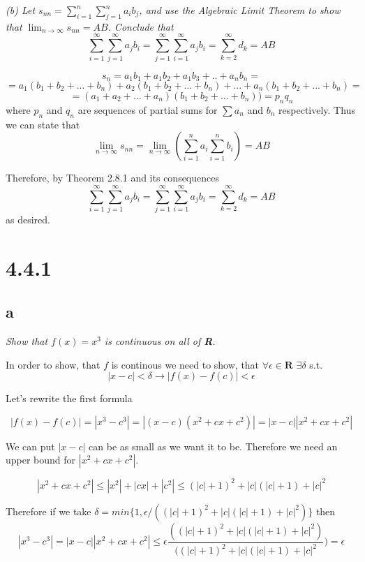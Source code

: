 \documentclass[11pt,oneside,titlepage]{article}
\begin{document}
\textit{(b) Let $s_{nn} = \sum_{i = 1}^n\sum_{j = 1}^n a_i b_j$, and use the
  Algebraic Limit Theorem to show that $\lim_{n \to \infty} s_{nn} = AB$.
  Conclude that }
$$\sum_{i = 1}^{\infty} \sum_{j = 1}^{\infty} a_j b_i =
\sum_{j = 1}^{\infty} \sum_{i = 1}^{\infty} a_j b_i =
\sum_{k = 2}^{\infty}  d_k = AB$$

$$s_n = a_1 b_1 + a_1 b_2 + a_1 b_3 + .. + a_n b_n = $$
$$= a_1 (b_1 + b_2 + ... + b_n) + a_2 (b_1 + b_2 + ... + b_n) + ...
+ a_n(b_1 + b_2 + ... + b_n) = $$
$$= (a_1 + a_2 + ... + a_n)(b_1 + b_2 + ... + b_n)) = p_n q_n$$
where $p_n$ and $q_n$ are sequences of partial sums for $\sum a_n$ and
$b_n$ respectively. Thus we can state that
$$\lim_{n \to \infty} s_{nn} = \lim_{n \to \infty} (\sum_{i = 1}^{n} a_i 
\sum_{i = 1}^{n} b_i) = AB$$

Therefore, by Theorem 2.8.1 and its consequences
$$\sum_{i = 1}^{\infty} \sum_{j = 1}^{\infty} a_j b_i =
\sum_{j = 1}^{\infty} \sum_{i = 1}^{\infty} a_j b_i =
\sum_{k = 2}^{\infty}  d_k = AB$$
as desired.


\section*{4.4.1}

\subsection*{{a}}
\textit{Show that $f(x) = x^{3}$ is continuous on all of \textbf{R}.}

In order to show, that $f$ is continous we need to show, that $\forall
\epsilon \in \textbf{R}$ $\exists \delta$ s.t.
$$|x - c| < \delta \to |f(x) - f(c)| < \epsilon$$

Let's rewrite the first formula

$$ |f(x) - f(c)| = |x^{3} - c^{3}| = |(x - c)(x^{2} + cx + c^{2})| =
|x - c||x^{2} + cx + c^{2}|$$

We can put $|x - c|$ can be as small as we want it to be. Therefore we need
an upper bound for $|x^{2} + cx + c^{2}|$.

$$|x^{2} + cx + c^{2}| \leq |x^{2}| + |cx| + |c^{2}| \leq (|c| + 1)^{2} +
|c|(|c| + 1) + |c|^{2}$$



Therefore if we take
$\delta = min\{1, \epsilon/((|c| + 1)^{2} + |c|(|c| + 1) + |c|^{2})\}$
then
$$|x^3 - c^3| = |x-c||x^2 + cx + c^2| \leq \epsilon \frac{((|c| + 1)^{2} +
  |c|(|c| + 1) + |c|^{2}) }{ ((|c| + 1)^{2} + |c|(|c| + 1) + |c|^{2}})
= \epsilon$$
\end{document}
